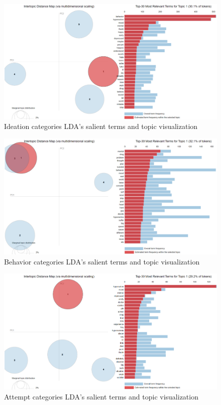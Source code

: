 \documentclass[sn-mathphys,Numbered]{sn-jnl}%
\theoremstyle{thmstyleone}%
\theoremstyle{thmstyletwo}%
\theoremstyle{thmstylethree}%
\begin{document}
\begin{figure}[h!]
    \includegraphics[width=\textwidth]{Ideation_pyldvis.png}
    \caption{Ideation categories LDA's salient terms and topic visualization}
    \label{Ideation_pyldvis}
\end{figure}

\begin{figure}[h!]
    \includegraphics[width=\textwidth]{Behavior_pyldvis.png}
    \caption{Behavior categories LDA's salient terms and topic visualization}
    \label{Behavior_pyldvis}
\end{figure}

\begin{figure}[h!]
    \includegraphics[width=\textwidth]{Attempt_pyldvis.png}
    \caption{Attempt categories LDA's salient terms and topic visualization}
    \label{Attempt_pyldvis}
\end{figure}
\end{document}
